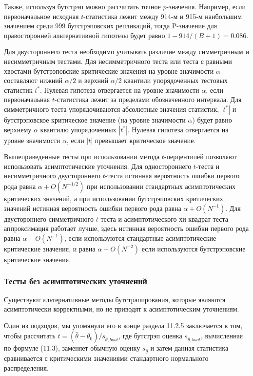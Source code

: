 Также, используя бутстрэп можно рассчитать точное $p$-значения. Например, если первоначальное исходная $t$-статистика лежит между 914-м и 915-м наибольшим значением среди 999 бутстрэповских репликаций, тогда P-значение для правосторонней альтернативной гипотезы будет равно $1-914/(B+1)=0.086$.

Для двустороннего теста необходимо учитывать различие между симметричным и несимметричным тестами. Для несимметричного теста или теста с равными хвостами бутстрэповские критические значения на уровне значимости $\alpha$ составляют нижний $\alpha/2$ и верхний $\alpha/2$ квантили упорядоченных тестовых статистик $t^*$. Нулевая гипотеза отвергается на уровне значимости $\alpha$, если первоначальная $t$-статистика лежит за пределами обозначенного интервала. Для симметричного теста упорядочиваются абсолютные значения статистик, $|t^*|$ и бутстрэповское критическое значение (на уровне значимости $\alpha$) будет равно верхнему $\alpha$ квантилю упорядоченных $|t^*|$. Нулевая гипотеза отвергается на уровне значимости $\alpha$, если $|t|$ превышает критическое значение.

Вышеприведенные тесты при использовании метода $t$-перцентилей позволяют использовать асимптотические уточнения. Для одностороннего $t$-теста и несимметричного двустороннего $t$-теста истинная вероятность ошибки первого рода равна $\alpha+O(N^{-1/2})$ при использовании стандартных асимптотических критических значений, а при использовании бутстрэповских критических значений  истинная вероятность ошибки первого рода равна  $\alpha+O(N^{-1})$. Для двустороннего симметричного $t$-теста и асимптотического хи-квадрат теста аппроксимация работает лучше, здесь истинная вероятность ошибки первого рода равна $\alpha+O(N^{-1})$, если используются стандартные асимптотические критические значения, и равна  $\alpha+O(N^{-2})$ если используются бутстрэповские критические значения. 


\subsubsection*{Тесты без асимптотических уточнений}

Существуют альтернативные методы бутстрапирования, которые являются асимптотически корректными, но не приводят к асимптотическим уточнениям.

Один из подходов, мы упомянули его в конце раздела 11.2.5 заключается в том, чтобы рассчитать $t=(\hat{\theta}-\theta_0)/s_{\hat{\theta},boot}$, где бутстрэп оценка $s_{\hat{\theta},boot}$, вычисленная по формуле (11.3), заменяет обычную оценку $s_{\hat{\theta}}$ и затем данная статистика  сравнивается с критическими значениями стандартного нормального распределения.

